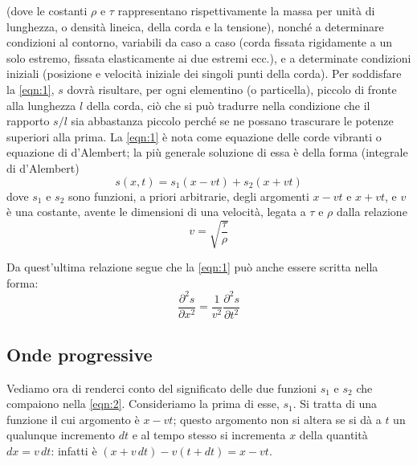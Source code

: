 \documentclass[a4paper]{article}
\begin{document}
(dove le costanti $\rho$ e $\tau$ rappresentano rispettivamente la massa per unità di lunghezza, o densità lineica, della corda e la tensione), nonché a determinare condizioni al contorno, variabili da caso a caso (corda fissata rigidamente a un solo estremo, fissata elasticamente ai due estremi ecc.), e a determinate condizioni iniziali (posizione e velocità iniziale dei singoli punti della corda). 
Per soddisfare la \eqref{eqn:1}, 
$s$ dovrà risultare, per ogni elementino (o particella), piccolo di fronte alla lunghezza $l$ della corda, ciò che si può tradurre nella condizione che il rapporto $s/l$ sia abbastanza piccolo perché se ne possano trascurare le potenze superiori alla prima. La \eqref{eqn:1} è nota come equazione delle corde vibranti o equazione di d'Alembert; la più generale soluzione di essa è della forma (integrale di d'Alembert) 
\begin{equation}
\label{eqn:2}
s(x,t)=s_1(x-vt)+s_2(x+vt)
\end{equation}
dove $s_1$ e $s_2$ sono funzioni, a priori arbitrarie, degli argomenti $x-vt$ e $x+vt$, e $v$ è una costante, avente le dimensioni di una velocità, legata a $\tau$ e $\rho$ dalla relazione 
\begin{equation*}
v=\sqrt{\frac{\tau}{\rho}}
\end{equation*}

Da quest'ultima relazione segue che la \eqref{eqn:1} può anche essere scritta nella forma: 
\begin{equation}
\label{eqn:3}
\frac{\partial^2 s}{\partial x^2}=\frac{1}{v^2}\frac{\partial^2 s}{\partial t^2}
\end{equation}

\subsection{Onde progressive}
Vediamo ora di renderci conto del significato delle due funzioni $s_1$ e $s_2$ che compaiono nella \eqref{eqn:2}. Consideriamo la prima di esse, $s_1$. Si tratta di una funzione il cui argomento è $x-vt$; questo argomento non si altera se si dà a $t$ un qualunque incremento $dt$ e al tempo stesso si incrementa $x$ della quantità $dx=v\,dt$: infatti è $(x + v\,dt) - v(t + dt) = x - vt$.
\end{document}
